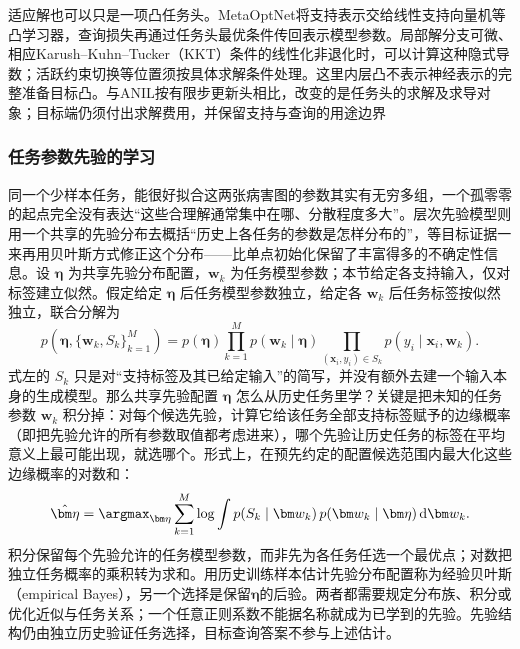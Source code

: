 适应解也可以只是一项凸任务头。MetaOptNet将支持表示交给线性支持向量机等凸学习器，查询损失再通过任务头最优条件传回表示模型参数。局部解分支可微、相应Karush--Kuhn--Tucker（KKT）条件的线性化非退化时，可以计算这种隐式导数；活跃约束切换等位置须按具体求解条件处理。这里内层凸不表示神经表示的完整准备目标凸。与ANIL按有限步更新头相比，改变的是任务头的求解及求导对象；目标端仍须付出求解费用，并保留支持与查询的用途边界

\subsubsection{任务参数先验的学习}
\label{sec:ket-transfer-prior}

同一个少样本任务，能很好拟合这两张病害图的参数其实有无穷多组，一个孤零零的起点完全没有表达“这些合理解通常集中在哪、分散程度多大”。层次先验模型则用一个共享的先验分布去概括“历史上各任务的参数是怎样分布的”，等目标证据一来再用贝叶斯方式修正这个分布——比单点初始化保留了丰富得多的不确定性信息。设 $\bm\eta$ 为共享先验分布配置，$\bm w_k$ 为任务模型参数；本节给定各支持输入，仅对标签建立似然。假定给定 $\bm\eta$ 后任务模型参数独立，给定各 $\bm w_k$ 后任务标签按似然独立，联合分解为
\begin{equation}
  p(\bm\eta,\{\bm w_k,S_k\}_{k=1}^{M})
   =p(\bm\eta)\prod_{k=1}^{M}
      p(\bm w_k\mid\bm\eta)
      \prod_{(\bm x_i,y_i)\in S_k}
      p(y_i\mid\bm x_i,\bm w_k).
  \label{eq:ket-transfer-hierarchical-model}
\end{equation}
式左的 $S_k$ 只是对“支持标签及其已给定输入”的简写，并没有额外去建一个输入本身的生成模型。那么共享先验配置 $\bm\eta$ 怎么从历史任务里学？关键是把未知的任务参数 $\bm w_k$ 积分掉：对每个候选先验，计算它给该任务全部支持标签赋予的边缘概率（即把先验允许的所有参数取值都考虑进来），哪个先验让历史任务的标签在平均意义上最可能出现，就选哪个。形式上，在预先约定的配置候选范围内最大化这些边缘概率的对数和：
\begin{equation}
  \hat{\bm\eta}
  =\argmax_{\bm\eta}\sum_{k=1}^{M}
     \log\int p(S_k\mid\bm w_k)\,
          p(\bm w_k\mid\bm\eta)\,\mathrm d\bm w_k.
  \label{eq:ket-transfer-empirical-bayes}
\end{equation}
积分保留每个先验允许的任务模型参数，而非先为各任务任选一个最优点；对数把独立任务概率的乘积转为求和。用历史训练样本估计先验分布配置称为经验贝叶斯（empirical Bayes），另一个选择是保留$\bm\eta$的后验。两者都需要规定分布族、积分或优化近似与任务关系；一个任意正则系数不能据名称就成为已学到的先验。先验结构仍由独立历史验证任务选择，目标查询答案不参与上述估计。

